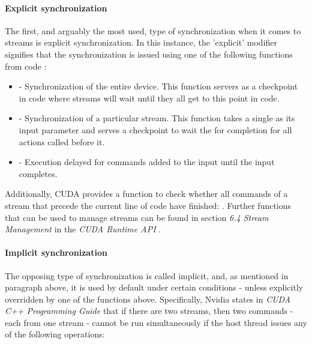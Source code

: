 \paragraph{Explicit synchronization}\label{Paragraph:theory-CUDA-asynchronous-concurrent-execution-streams-explicit-synchronization}
The first, and arguably the most used, type of synchronization when it comes to streams is explicit synchronization. In this instance, the 'explicit' modifier signifies that the synchronization is issued using one of the following functions from code \cite{NVIDIAMay2022, NvidiaJanuary2022}:
\begin{itemize}
	\item {} - Synchronization of the entire device. This function servers as a checkpoint in code where streams will wait until they all get to this point in code.
	\item {} - Synchronization of a particular stream. This function takes a single  as its input parameter and serves a checkpoint to wait the for completion for all actions called before it.
	\item {} - Execution delayed for commands added to the input  until the input  completes.
\end{itemize}

Additionally, CUDA provides a function to check whether all commands of a stream that precede the current line of code have finished: . Further functions that can be used to manage streams can be found in section \emph{6.4 Stream Management} in the \emph{CUDA Runtime API} \cite{NvidiaJanuary2022}.

\paragraph{Implicit synchronization}\label{Paragraph:theory-CUDA-asynchronous-concurrent-execution-streams-implicit-synchronization}
The opposing type of synchronization is called implicit, and, as mentioned in paragraph \textit{} above, it is used by default under certain conditions - unless explicitly overridden by one of the functions above. Specifically, Nvidia states in \emph{CUDA C++ Programming Guide} \cite{NVIDIAMay2022} that if there are two streams, then two commands - each from one stream - cannot be run simultaneously if the host thread issues any of the following operations:

